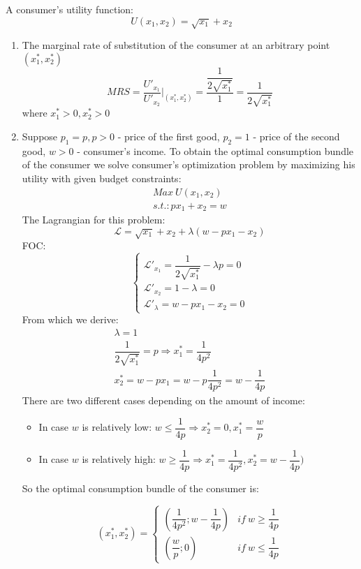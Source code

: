 \documentclass[a4paper,12pt]{article} %
\begin{document}
A consumer’s  utility function:
\[ U(x_1, x_2) = \sqrt{x_1}  + x_2 \]
 
 \begin{enumerate}
 	\item The marginal rate of substitution of the consumer at an arbitrary point $ (x^{*}_{1}, x^{*}_{2}) $
 	\[ MRS   =   \dfrac{U'_{x_1}}{U'_{x_2}}    \Big|_{(x^{*}_{1}, x^{*}_{2})}    =  \dfrac{\dfrac{1}{2\sqrt{x_1^{*}}  }}{1}    =  \dfrac{1}{2\sqrt{x_1^{*}}  } \]
 	where $ x^{*}_{1} > 0, x^{*}_{2} > 0 $
 	\item Suppose $ p_1 = p, p > 0 $ - price of the first good, $ p_2 = 1 $ - price of the second good, $ w > 0 $ -  consumer’s income.  
 		\newpage
 	 To obtain the optimal consumption
 	bundle of the consumer we solve consumer's optimization problem by maximizing his utility with given budget constraints: 
 	\begin{gather*}
    Max \   U(x_1, x_2)  \\
 	s.t.: px_1 + x_2 = w 
 	\end{gather*}
 	The  Lagrangian for this problem: 
 	\[  \mathcal{L} =   \sqrt{x_1}  + x_2 + \lambda  ( w - px_1 - x_2  ) \]
 	FOC: 
 	\begin{equation*}
 	 \begin{cases}
 	\mathcal{L}'_{x_1 } =    \dfrac{1}{2\sqrt{x_1^{*}}  }  -   \lambda  p = 0 \\
 	\mathcal{L}'_{x_2 } =   1 -  \lambda = 0 \\
 	\mathcal{L}'_{\lambda} = w - px_1 - x_2 = 0 
 	\end{cases}
 	\end{equation*}
 	From which we derive:
 		\begin{gather*}
 \lambda = 1\\
   \dfrac{1}{2\sqrt{x_1^{*}}  }  =  p \Rightarrow  x^{*}_{1} = \dfrac{1}{4p^{2}}  \\
 	 x_{2}^{*} = w - px_1 = w - p\dfrac{1}{4p^{2}} =  w - \dfrac{1}{4p}   
 	\end{gather*}
 There are two different cases depending on the amount of income: 
\begin{itemize}
	\item In case  $ w $ is relatively low:   $ w \leq  \dfrac{1}{4p} \Rightarrow  x^{*}_{2} = 0,  x^{*}_{1} = \dfrac{w}{p}   $
		
	\item In case  $ w $ is relatively high:   $ w \geq  \dfrac{1}{4p}  \Rightarrow  x^{*}_{1} = \dfrac{1}{4p^{2}},  x^{*}_{2} = w - \dfrac{1}{4p}) $
\end{itemize}
 	
 		So  the optimal consumption
 	bundle of the consumer   is:
 	
\begin{equation*}
 (x^{*}_{1}, x^{*}_{2}) = 
  \begin{cases}
 (\dfrac{1}{4p^{2}};  w - \dfrac{1}{4p}) &  if \  w \geq  \dfrac{1}{4p} \\
 (\dfrac{w}{p}; 0) & if\ w \leq  \dfrac{1}{4p}
 \end{cases}   
\end{equation*} 	 
 	

 \end{enumerate}
\end{document}
